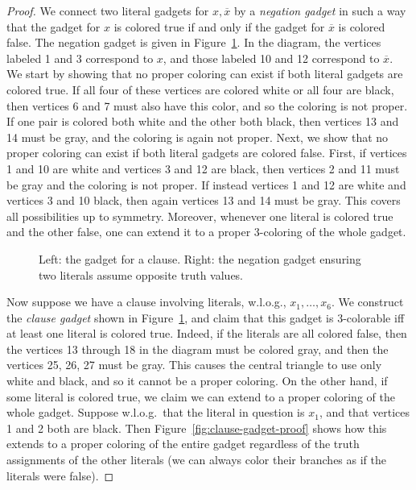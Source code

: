 \begin{proof}
We connect two literal gadgets for $x, \overline{x}$ by a \emph{negation
gadget} in such a way that the gadget for $x$ is colored true if and only if
the gadget for $\overline{x}$ is colored false. The negation gadget is given in
Figure~\ref{fig:clause-and-negation-gadget}. In the diagram, the vertices
labeled 1 and 3 correspond to $x$, and those labeled 10 and 12 correspond to
$\overline{x}$. We start by showing that no proper coloring can exist if both
literal gadgets are colored true. If all four of these vertices are colored
white or all four are black, then vertices 6 and 7 must also have this color,
and so the coloring is not proper. If one pair is colored both white and the
other both black, then vertices 13 and 14 must be gray, and the coloring is
again not proper.  Next, we show that no proper coloring can exist if both
literal gadgets are colored false. First, if vertices 1 and 10 are white and
vertices 3 and 12 are black, then vertices 2 and 11 must be gray and the
coloring is not proper. If instead vertices 1 and 12 are white and vertices 3
and 10 black, then again vertices 13 and 14 must be gray. This covers all
possibilities up to symmetry.  Moreover, whenever one literal is colored true
and the other false, one can extend it to a proper 3-coloring of the whole
gadget. 

\begin{figure}
\centering
{}
\caption{Left: the gadget for a clause. Right: the negation gadget ensuring two
literals assume opposite truth values.} 
\label{fig:clause-and-negation-gadget}
\end{figure}


Now suppose we have a clause involving literals, w.l.o.g., $x_1, \dots, x_6$.
We construct the \emph{clause gadget} shown in
Figure~\ref{fig:clause-and-negation-gadget}, and claim that this gadget is
3-colorable iff at least one literal is colored true. Indeed, if the literals
are all colored false, then the vertices  13 through 18 in the diagram must be
colored gray, and then the vertices 25, 26, 27 must be gray. This causes the
central triangle to use only white and black, and so it cannot be a proper
coloring. On the other hand, if some literal is colored true, we claim we can
extend to a proper coloring of the whole gadget.  Suppose w.l.o.g.\ that the
literal in question is $x_1$, and that vertices 1 and 2 both are black. Then
Figure~\ref{fig:clause-gadget-proof} shows how this extends to a proper
coloring of the entire gadget regardless of the truth assignments of the other
literals (we can always color their branches as if the literals were false). 


\end{proof}
